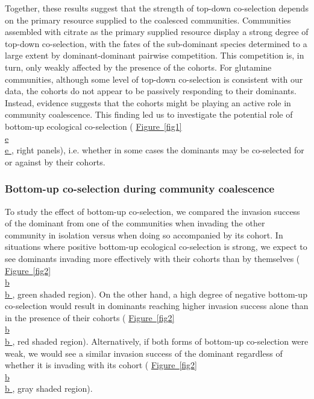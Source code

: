 \documentclass[a4paper,10pt]{article}
\newcommand{\figref}[2][]{%
  \hyperref[{#2}]{%
    Figure~\ref*{#2}%
    \ifx\\#1\\%
    \else
      #1%
    \fi
  }%
}
\begin{document}
Together, these results suggest that the strength of top-down co-selection depends on
the primary resource supplied to the coalesced communities.
Communities assembled with citrate as the primary supplied resource
display a strong degree of top-down co-selection,
with the fates of the sub-dominant species determined to a large extent by dominant-dominant
pairwise competition. This competition is, in turn, only weakly affected by the presence of the cohorts.
For glutamine communities, although some level of top-down co-selection is consistent with our data,
the cohorts do not appear to be passively responding to their dominants.
Instead, evidence suggests that the cohorts might be playing an active role in community coalescence.
This finding led us to investigate the potential role of bottom-up ecological co-selection
(\figref[e]{fig1}, right panels), i.e. whether in some cases the dominants may be co-selected
for or against by their cohorts.

\subsubsection*{Bottom-up co-selection during community coalescence}

To study the effect of bottom-up co-selection, we compared the invasion success of the dominant
from one of the communities when invading the other community in isolation versus when doing so
accompanied by its cohort.
In situations where positive bottom-up ecological co-selection is strong, we expect to see dominants
invading more effectively with their cohorts than by themselves
(\figref[b]{fig2}, green shaded region).
On the other hand, a high degree of negative bottom-up co-selection would result in dominants reaching
higher invasion success alone than in the presence of their cohorts
(\figref[b]{fig2}, red shaded region).
Alternatively, if both forms of bottom-up co-selection were weak, we would see a similar invasion
success of the dominant regardless of whether it is invading with its cohort
(\figref[b]{fig2}, gray shaded region).
\end{document}
